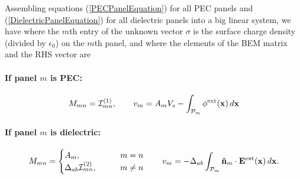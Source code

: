 \documentclass[letterpaper]{article}
\begin{document}
Assembling equations (\ref{PECPanelEquation}) for all PEC panels
and (\ref{DielectricPanelEquation}) for all dielectric panels 
into a big linear system, we have 
where the $m$th entry of the unknown vector $\sigma$ is the 
surface charge density (divided by $\epsilon_0$) on the $m$th
panel, and where the elements of the BEM matrix and the RHS vector are
\paragraph{If panel $m$ is PEC:}
$$ M_{mn} = \mathcal{I}^{\hbox{\scriptsize{(1)}}}_{mn}, 
   \qquad 
   v_m = A_{m} V_s - \int_{\mathcal{P}_m} \phi^{\hbox{\scriptsize{ext}}}(\mathbf{x}) \, d\mathbf{x}
$$
\paragraph{If panel $m$ is dielectric:}
$$ M_{mn} = 
   \begin{cases} 
     A_m, \qquad &m=n \\
     \Delta_{ab} \mathcal{I}^{\hbox{\scriptsize{(2)}}}_{mn}, \qquad &m\ne n
   \end{cases} 
   \qquad 
   v_m = -\Delta_{ab} \int_{\mathcal{P}_m} \mathbf{\hat n}_m \cdot \mathbf{E}^{\hbox{\scriptsize{ext}}}(\mathbf{x}) \, d\mathbf{x}.
$$

\end{document}

